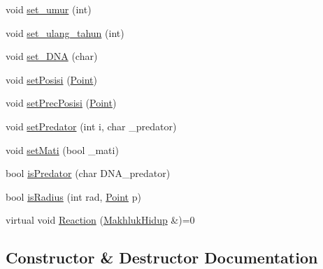 \begin{DoxyCompactItemize}
\item 
void \hyperlink{class_makhluk_hidup_adc7715c1915723fdf42ff205458923e7}{set\+\_\+umur} (int)
\item 
void \hyperlink{class_makhluk_hidup_a9db02ead4d61096dbd8f7a9e26901e71}{set\+\_\+ulang\+\_\+tahun} (int)
\item 
void \hyperlink{class_makhluk_hidup_a816be4a8a08a2daccab170b99fb26ce9}{set\+\_\+\+D\+NA} (char)
\item 
void \hyperlink{class_makhluk_hidup_a62cb644f5defd2cc68783f52ef954b57}{set\+Posisi} (\hyperlink{class_point}{Point})
\item 
void \hyperlink{class_makhluk_hidup_a57c79d6367c021752d85599ea6edf6da}{set\+Prec\+Posisi} (\hyperlink{class_point}{Point})
\item 
void \hyperlink{class_makhluk_hidup_add4f38ec95f2c1e5b715a7184105288a}{set\+Predator} (int i, char \+\_\+predator)
\item 
void \hyperlink{class_makhluk_hidup_a0946620dcf0255e00953f815c976bd4b}{set\+Mati} (bool \+\_\+mati)
\item 
bool \hyperlink{class_makhluk_hidup_aa1b9047625c71988c79bb451622f3218}{is\+Predator} (char D\+N\+A\+\_\+predator)
\item 
bool \hyperlink{class_makhluk_hidup_a2c7cb45ed87a2dab9fd279c528a6d478}{is\+Radius} (int rad, \hyperlink{class_point}{Point} p)
\item 
virtual void \hyperlink{class_makhluk_hidup_a7aafd6122203f48a43b384a9d8175396}{Reaction} (\hyperlink{class_makhluk_hidup}{Makhluk\+Hidup} \&)=0
\end{DoxyCompactItemize}


\subsection{Constructor \& Destructor Documentation}

